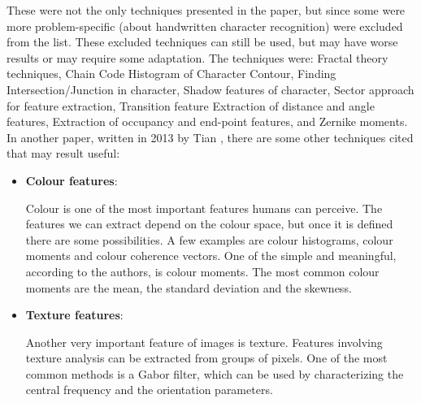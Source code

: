 \documentclass[conference]{IEEEtran}
\begin{document}
				
				\noindent These were not the only techniques presented in the paper, but since some were more problem-specific (about handwritten character recognition)
				were excluded from the list. These excluded techniques can still be used, but may have worse results or may require some adaptation. 
				The techniques were: Fractal theory techniques, Chain Code Histogram of Character Contour, Finding Intersection/Junction in character, 
				Shadow features of character, Sector approach for feature extraction, Transition feature
				Extraction of distance and angle features, Extraction of occupancy and end-point features, and Zernike moments.\\
				In another paper, written in 2013 by Tian \cite{ping2013review}, there are some other techniques cited that may result useful:
				
				\begin{itemize}
				
					\item \textbf{Colour features}:
						
						Colour is one of the most important features humans can perceive. 
						The features we can extract depend on the colour space, but once it is defined there are some possibilities. 
						A few examples are colour histograms, colour moments and colour coherence vectors. 
						One of the simple and meaningful, according to the authors, is colour moments. 
						The most common colour moments are the mean, the standard deviation and the skewness. 
						
					\item \textbf{Texture features}:
					
						Another very important feature of images is texture. 
						Features involving texture analysis can be extracted from groups of pixels. 
						One of the most common methods is a Gabor filter, which can be used by characterizing the central frequency and the orientation parameters.
				
				\end{itemize}
				
\end{document}

